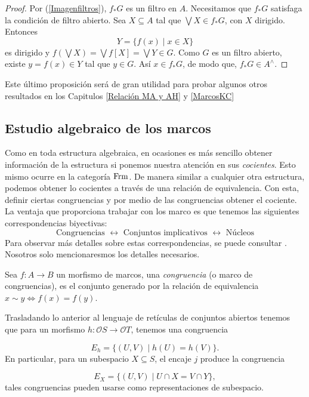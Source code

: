 \begin{proof}
Por (\ref{Imagenfiltros}), $f_*G$ es un filtro en $A$. Necesitamos que $f_*G$ satisfaga la condición de filtro abierto. Sea $X\subseteq A$ tal que $\bigvee X\in f_*G$, con $X$ dirigido. Entonces
\[
Y=\{f(x)\mid x\in X\}
\] 
es dirigido y $f(\bigvee X)=\bigvee f[X]=\bigvee Y\in G$. Como $G$ es un filtro abierto, existe $y=f(x)\in Y$ tal que $y\in G$. Así $x\in f_*G$, de modo que, $f_*G\in A^\wedge$.
\end{proof}

Este último proposición será de gran utilidad para probar algunos otros resultados en los Capitulos \ref{Relación MA y AH} y \ref{MarcosKC}
\subsection{Estudio algebraico de los marcos}

Como en toda estructura algebraica, en ocasiones es más sencillo obtener información de la estructura si ponemos nuestra atención en sus \emph{cocientes}. Esto mismo ocurre en la categoría $\mathrm{Frm}$. 
De manera similar a cualquier otra estructura, podemos obtener lo cocientes a través de una relación de equivalencia. Con esta, definir ciertas congruencias y por medio de las congruencias obtener 
el cociente.\\

La ventaja que proporciona trabajar con los marco es que tenemos las siguientes correspondencias biyectivas:
\[
\mbox{Congruencias }\leftrightarrow \mbox{ Conjuntos implicativos }\leftrightarrow \mbox{ Núcleos}
\]
Para observar más detalles sobre estas correspondencias, se puede consultar \cite{A.Z.}. Nosotros solo mencionaresmos los detalles necesarios.

\begin{dfn}
Sea $f:A\to B$ un morfismo de marcos, una \emph{congruencia} (o marco de congruencias), es el conjunto generado por la relación de equivalencia $x\sim y\Leftrightarrow f(x)=f(y)$.
\end{dfn}

Trasladando lo anterior al lenguaje de retículas de conjuntos abiertos tenemos que para un morfismo $h\colon \mathcal{O}S\to\mathcal{O}T$, tenemos una congruencia

\[
E_h=\{(U,V)\mid h(U)=h(V)\}.
\]
En particular, para un subespacio $X\subseteq S$, el encaje $j$ produce la congruencia

\[
E_X=\{(U,V)\mid U\cap X=V\cap Y\},
\]
tales congruencias pueden usarse como representaciones de subespacio.\\

